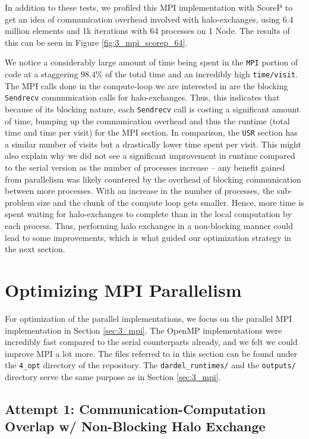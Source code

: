 \documentclass[a4paper,10pt]{article}
\begin{document}
\begin{multicols}{2}
In addition to these tests, we profiled this MPI implementation with ScoreP to get an idea of communication overhead involved with halo-exchanges, using 6.4 million elements and 1k iterations with 64 processes on 1 Node. The results of this can be seen in Figure \ref{fig:3_mpi_scorep_64}. 

We notice a considerably large amount of time being spent in the \verb|MPI| portion of code at a staggering $98.4\%$ of the total time and an incredibly high \verb|time/visit|. The MPI calls done in the compute-loop we are interested in are the blocking \verb|Sendrecv| communication calls for halo-exchanges. Thus, this indicates that because of its blocking nature, each \verb|Sendrecv| call is costing a significant amount of time, bumping up the communication overhead and thus the runtime (total time and time per visit) for the MPI section. In comparison, the \verb|USR| section has a similar number of visits but a drastically lower time spent per visit. This might also explain why we did not see a significant improvement in runtime compared to the serial version as the number of processes increase -- any benefit gained from parallelism was likely countered by the overhead of blocking communication between more processes. With an increase in the number of processes, the sub-problem size and the chunk of the compute loop gets smaller. Hence, more time is spent waiting for halo-exchanges to complete than in the local computation by each process. Thus, performing halo exchanges in a non-blocking manner could lead to some improvements, which is what guided our optimization strategy in the next section.

\section{Optimizing MPI Parallelism}
For optimization of the parallel implementations, we focus on the parallel MPI implementation in Section \ref{sec:3_mpi}. The OpenMP implementations were incredibly fast compared to the serial counterparts already, and we felt we could improve MPI a lot more. The files referred to in this section can be found under the \verb|4_opt| directory of the repository. The \verb|dardel_runtimes/| and the \verb|outputs/| directory serve the same purpose as in Section \ref{sec:3_mpi}.

\subsection{Attempt 1: Communication-Computation Overlap w/ Non-Blocking Halo Exchange}
\label{sec:async_mpi}
\end{multicols}
\end{document}
